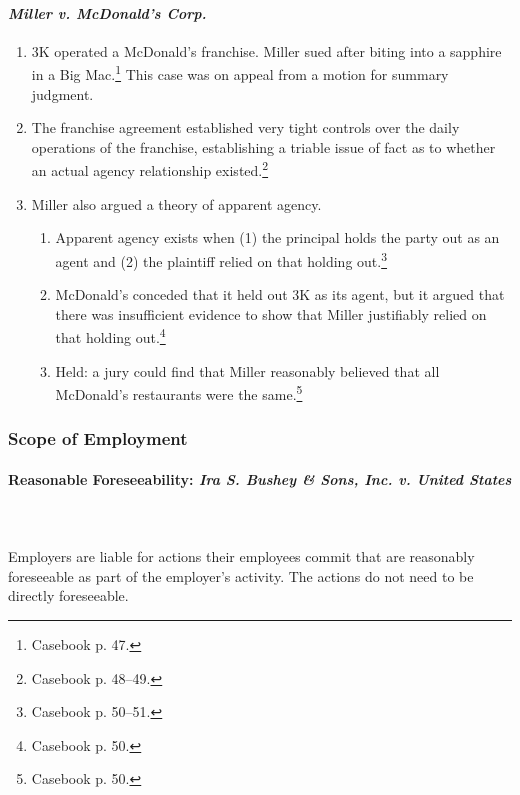 \paragraph{\emph{Miller v. McDonald's Corp.}}

\begin{enumerate}
    \item 3K operated a McDonald's franchise. Miller sued after biting into a 
    sapphire in a Big Mac.\footnote{Casebook p. 47.} This case was on appeal 
    from a motion for summary judgment.
    \item The franchise agreement established very tight controls over the 
    daily operations of the franchise, establishing a triable issue of fact as 
    to whether an actual agency relationship existed.\footnote{Casebook p. 
    48--49.}
    \item Miller also argued a theory of apparent agency.
    \begin{enumerate}
        \item Apparent agency exists when (1) the principal holds the party 
        out as an agent and (2) the plaintiff relied on that holding 
        out.\footnote{Casebook p. 50--51.}
        \item McDonald's conceded that it held out 3K as its agent, but it 
        argued that there was insufficient evidence to show that Miller 
        justifiably relied on that holding out.\footnote{Casebook p. 50.}
        \item Held: a jury could find that Miller reasonably believed that all 
        McDonald's restaurants were the same.\footnote{Casebook p. 50.}
    \end{enumerate}
\end{enumerate}

\subsubsection{Scope of Employment}

\paragraph{Reasonable Foreseeability: \emph{Ira S. Bushey \& Sons, Inc. v. 
United States}}
~\\\\
Employers are liable for actions their employees commit that are reasonably 
foreseeable as part of the employer's activity. The actions do not need to be 
directly foreseeable.

